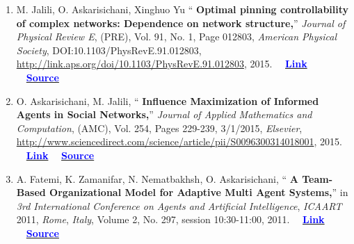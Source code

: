 \documentclass[letter]{res}
\begin{document}
\begin{resume}
\begin{enumerate}[leftmargin=-.01in]
			\item M. Jalili, O. Askarisichani, Xinghuo Yu `` \textbf{Optimal pinning controllability of complex networks: Dependence on network structure,}''
			\textit{Journal of Physical Review E}, (PRE), Vol. 91, No. 1, Page 012803, \textit{American Physical Society}, DOI:10.1103/PhysRevE.91.012803,\\
			\href{http://link.aps.org/doi/10.1103/PhysRevE.91.012803}{http://link.aps.org/doi/10.1103/PhysRevE.91.012803}, 2015.
			~~\href{http://link.aps.org/doi/10.1103/PhysRevE.91.012803}{\textbf{\textcolor{blue}{Link}}}
			~~\href{https://github.com/omid55/optimal_pinning_control}{\textbf{\textcolor{blue}{Source}}}
			
			\item O. Askarisichani, M. Jalili, `` \textbf{Influence Maximization of Informed Agents in Social Networks,}'' \textit{Journal of Applied Mathematics and Computation}, (AMC), Vol. 254, Pages 229-239, 3/1/2015, \textit{Elsevier},\\
			\href{http://www.sciencedirect.com/science/article/pii/S0096300314018001}{http://www.sciencedirect.com/science/article/pii/S0096300314018001}, 2015.
			~~\href{http://dx.doi.org/10.1016/j.amc.2014.12.139}{\textbf{\textcolor{blue}{Link}}}
			~~\href{https://github.com/omid55/influence_maximization}{\textbf{\textcolor{blue}{Source}}}
			
			
			\item A. Fatemi, K. Zamanifar, N. Nematbakhsh, O. Askarisichani, `` \textbf{A Team-Based Organizational Model for Adaptive Multi Agent Systems,}'' in \textit{3rd International Conference on Agents and Artificial Intelligence}, \textit{ICAART} 2011, \textit{Rome}, \textit{Italy}, Volume 2, No. 297, session 10:30-11:00, 2011.
			~~\href{https://www.researchgate.net/publication/221539731_A_Team-based_Organizational_Model_for_Adaptive_Multi-agent_Systems}{\textbf{\textcolor{blue}{Link}}}
			~~\href{https://github.com/omid55/team_based_rescue_jade_multi_agent_system}{\textbf{\textcolor{blue}{Source}}}
			

\end{enumerate}
\end{resume}
\end{document}
